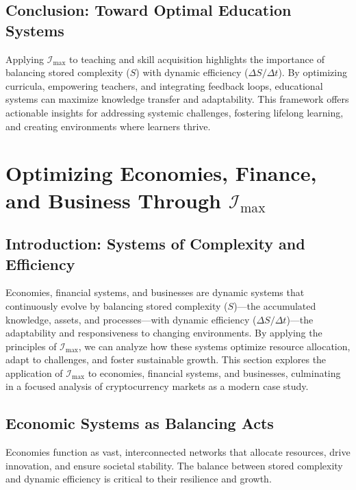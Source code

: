 \documentclass[12pt]{article}
\begin{document}
\subsection{Conclusion: Toward Optimal Education Systems}
Applying \(\mathcal{I}_{\text{max}}\) to teaching and skill acquisition highlights the importance of balancing stored complexity (\( S \)) with dynamic efficiency (\( \Delta S / \Delta t \)). By optimizing curricula, empowering teachers, and integrating feedback loops, educational systems can maximize knowledge transfer and adaptability. This framework offers actionable insights for addressing systemic challenges, fostering lifelong learning, and creating environments where learners thrive.


\section{Optimizing Economies, Finance, and Business Through \(\mathcal{I}_{\text{max}}\)}

\subsection{Introduction: Systems of Complexity and Efficiency}
Economies, financial systems, and businesses are dynamic systems that continuously evolve by balancing stored complexity (\( S \))—the accumulated knowledge, assets, and processes—with dynamic efficiency (\( \Delta S / \Delta t \))—the adaptability and responsiveness to changing environments. By applying the principles of \(\mathcal{I}_{\text{max}}\), we can analyze how these systems optimize resource allocation, adapt to challenges, and foster sustainable growth. This section explores the application of \(\mathcal{I}_{\text{max}}\) to economies, financial systems, and businesses, culminating in a focused analysis of cryptocurrency markets as a modern case study.

\subsection{Economic Systems as Balancing Acts}
Economies function as vast, interconnected networks that allocate resources, drive innovation, and ensure societal stability. The balance between stored complexity and dynamic efficiency is critical to their resilience and growth.
\end{document}
